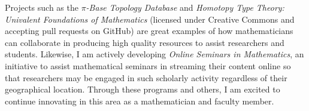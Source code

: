 \documentclass[11pt]{amsart}
\theoremstyle{plain}
\newcommand{\<}{\langle}
\renewcommand{\>}{\rangle}
\begin{document}
Projects such as the \textit{$\pi$-Base Topology Database} and
\textit{Homotopy Type Theory: Univalent Foundations of Mathematics} \cite{hottbook}
(licensed under Creative Commons and accepting pull requests on GitHub)
are great examples of how mathematicians can collaborate in producing
high quality resources to assist researchers and students. Likewise, I
am actively developing \textit{Online Seminars in Mathematics},
an initiative to
assist mathematical seminars in streaming their content online so that
researchers may be engaged in such scholarly activity regardless of their
geographical location.
Through these programs and others,
I am excited to continue innovating in this area
as a mathematician and faculty member.






\end{document}

